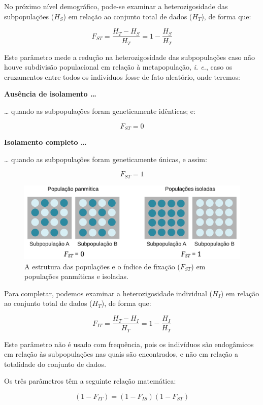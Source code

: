 \documentclass[
]{book}
\begin{document}
No próximo nível demográfico, pode-se examinar a heterozigosidade das subpopulações (\(H_S\)) em relação ao conjunto total de dados (\(H_T\)), de forma que:

\[F_{ST} = \frac{H_T-H_S}{H_T}=1-\frac{H_S}{H_T}\]

Este parâmetro mede a redução na heterozigosidade das subpopulações caso não houve subdivisão populacional em relação à metapopulação, \emph{i. e.}, caso os cruzamentos entre todos os indivíduos fosse de fato aleatório, onde teremos:

\textbf{Ausência de isolamento \ldots{}}

\ldots{} quando as subpopulações foram geneticamente idênticas; e:

\[F_{ST}=0\]

\textbf{Isolamento completo \ldots{}}

\ldots{} quando as subpopulações foram geneticamente únicas, e assim:

\[F_{ST}=1\]

\begin{figure}

{\centering \includegraphics[width=800px]{figs/fixation_index} 

}

\caption{A estrutura das populações e o índice de fixação ($F_{ST}$) em populações panmíticas e isoladas.}\label{fig:fixationindex}
\end{figure}

Para completar, podemos examinar a heterozigosidade individual (\(H_I\)) em relação ao conjunto total de dados (\(H_T\)), de forma que:

\[F_{IT} = \frac{H_T-H_I}{H_T}=1-\frac{H_I}{H_T}\]

Este parâmetro não é usado com frequência, pois os indivíduos são endogâmicos em relação às subpopulações nas quais são encontrados, e não em relação a totalidade do conjunto de dados.

Os três parâmetros têm a seguinte relação matemática:

\[\left( 1-F_{IT} \right) = \left( 1-F_{IS} \right ) \left( 1-F_{ST} \right)\]
\end{document}
